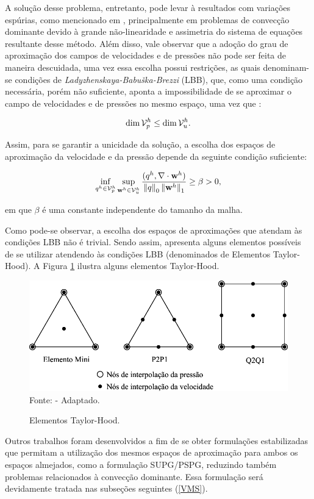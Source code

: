 A solução desse problema, entretanto, pode levar à resultados com variações espúrias, como mencionado em \cite{fernandes2020tecnica,donea2003finite,brooks1982streamline}, principalmente em problemas de convecção dominante devido à grande não-linearidade e assimetria do sistema de equações resultante desse método. Além disso, vale observar que a adoção do grau de aproximação dos campos de velocidades e de pressões não pode ser feita de maneira descuidada, uma vez essa escolha possui restrições, as quais denominam-se condições de \textit{Ladyzhenskaya-Babuška-Brezzi} (LBB), que, como uma condição necessária, porém não suficiente, aponta a impossibilidade de se aproximar o campo de velocidades e de pressões no mesmo espaço, uma vez que \cite{donea2003finite}:

\begin{equation}
    \dim{\mathcal{V}_p^h}\leq\dim{\mathcal{V}_u^h}\text{.}
\end{equation}

Assim, para se garantir a unicidade da solução, a escolha dos espaços de aproximação da velocidade e da pressão depende da seguinte condição suficiente:

\begin{equation}
    \inf_{q^h\in\mathcal{V}_p^h}{\sup_{\mathbf{w}^h\in\mathcal{V}_u^h}{\frac{(q^h,\mathbf{\nabla}\cdot\mathbf{w}^h)}{\left\lVert{q}\right\lVert_0\left\lVert{\mathbf{w}^h}\right\lVert_1}}}\geq\beta>0\text{,}
\end{equation}

\noindent em que $\beta$ é uma constante independente do tamanho da malha.

Como pode-se observar, a escolha dos espaços de aproximações que atendam às condições LBB não é trivial. Sendo assim,  apresenta alguns elementos possíveis de se utilizar atendendo às condições LBB (denominados de Elementos Taylor-Hood). A Figura \ref{fig:Taylor-Hood} ilustra alguns elementos Taylor-Hood.

\begin{figure}[h]
    \centering
    \caption{Elementos Taylor-Hood.}
    \includegraphics[width=.75\linewidth]{Figuras/Taylor-Hood.pdf}
    \\Fonte:  - Adaptado.
    \label{fig:Taylor-Hood}
\end{figure}

Outros trabalhos foram desenvolvidos a fim de se obter formulações estabilizadas que permitam a utilização dos mesmos espaços de aproximação para ambos os espaços almejados, como a formulação SUPG/PSPG, reduzindo também problemas relacionados à convecção dominante. Essa formulação será devidamente tratada nas subseções seguintes (\ref{VMS}).